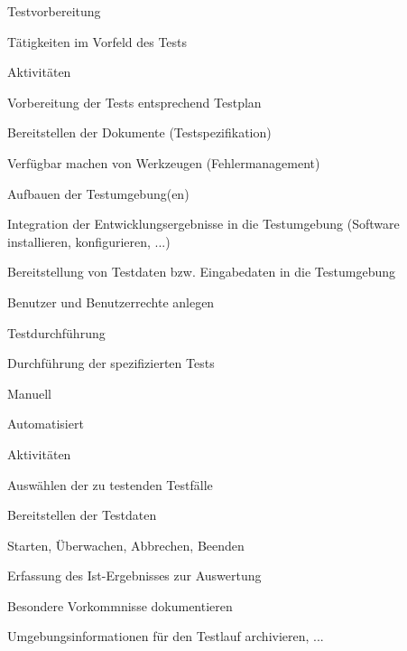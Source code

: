 \documentclass[a4paper]{article}
\begin{document}
\begin{multicols}{3}
  Testvorbereitung
  \begin{itemize*}
    \item Tätigkeiten im Vorfeld des Tests
    \item Aktivitäten
          \begin{itemize*}
            \item Vorbereitung der Tests entsprechend Testplan
            \item Bereitstellen der Dokumente (Testspezifikation)
            \item Verfügbar machen von Werkzeugen (Fehlermanagement)
            \item Aufbauen der Testumgebung(en)
            \item Integration der Entwicklungsergebnisse in die Testumgebung (Software installieren, konfigurieren, ...)
            \item Bereitstellung von Testdaten bzw. Eingabedaten in die Testumgebung
            \item Benutzer und Benutzerrechte anlegen
          \end{itemize*}
  \end{itemize*}

  Testdurchführung
  \begin{itemize*}
    \item Durchführung der spezifizierten Tests
          \begin{itemize*}
            \item Manuell
            \item Automatisiert
          \end{itemize*}
    \item Aktivitäten
          \begin{itemize*}
            \item Auswählen der zu testenden Testfälle
            \item Bereitstellen der Testdaten
            \item Starten, Überwachen, Abbrechen, Beenden
            \item Erfassung des Ist-Ergebnisses zur Auswertung
            \item Besondere Vorkommnisse dokumentieren
            \item Umgebungsinformationen für den Testlauf archivieren, ...
          \end{itemize*}
  \end{itemize*}


\end{multicols}
\end{document}
